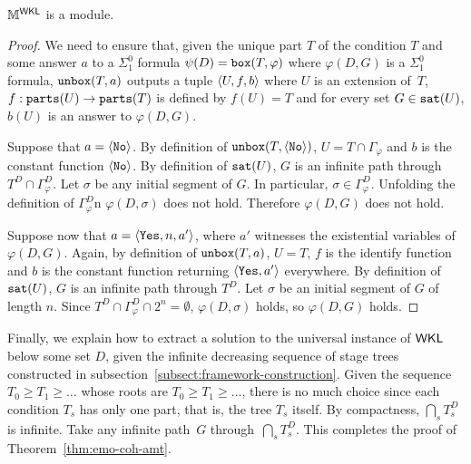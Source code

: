 \begin{lemma}
$\mathbb{M}^{\operatorname{\sf{WKL}}}$ is a module.
\end{lemma}
\begin{proof}
We need to ensure that, given the unique part $T$ of the condition $T$
and some answer $a$ to a $\Sigma^0_1$ formula $\psi(D) = \mathtt{box}(T, \varphi)$
where $\varphi(D, G)$ is a $\Sigma^0_1$ formula, $\mathtt{unbox}(T, a)$
outputs a tuple $\left\langle U, f, b \right\rangle$ where $U$ is an extension of~$T$,
$f : \mathtt{parts}(U) \to \mathtt{parts}(T)$ is defined by $f(U) = T$
and for every set $G \in \mathtt{sat}(U)$, $b(U)$ is an answer to $\varphi(D, G)$.

Suppose that $a = \left\langle \mathtt{No} \right\rangle$. By definition of $\mathtt{unbox}(T, \left\langle \mathtt{No} \right\rangle)$,
$U = T \cap \Gamma_\varphi$ and $b$ is the constant function $\left\langle \mathtt{No} \right\rangle$. 
By definition of $\mathtt{sat}(U)$, $G$ is an infinite path through $T^D \cap \Gamma^D_\varphi$.
Let $\sigma$ be any initial segment of $G$. In particular, $\sigma \in \Gamma^D_\varphi$. Unfolding the definition of $\Gamma^D_\varphi$n
$\varphi(D, \sigma)$ does not hold. Therefore $\varphi(D, G)$ does not hold.

Suppose now that $a = \left\langle \mathtt{Yes}, n, a' \right\rangle$, where $a'$ witnesses the existential variables of $\varphi(D, G)$.
Again, by definition of $\mathtt{unbox}(T, a)$, $U = T$, $f$ is the identify function 
and $b$ is the constant function returning $\left\langle \mathtt{Yes}, a' \right\rangle$ everywhere.
By definition of $\mathtt{sat}(U)$, $G$ is an infinite path through $T^D$.
Let $\sigma$ be an initial segment of $G$ of length $n$. Since $T^D \cap \Gamma^D_\varphi \cap 2^n = \emptyset$,
$\varphi(D, \sigma)$ holds, so $\varphi(D, G)$ holds.
\end{proof}

Finally, we explain how to extract a solution to the universal instance of $\operatorname{\sf{WKL}}$ below some set $D$,
given the infinite decreasing sequence of stage trees constructed in subsection~\ref{subsect:framework-construction}.
Given the sequence $T_0 \geq T_1 \geq \dots$ whose roots are $T_0 \geq T_1 \geq \dots$,
there is no much choice since each condition $T_s$ has only one part, that is, the tree $T_s$ itself.
By compactness, $\bigcap_s T_s^D$ is infinite. Take any infinite path~$G$ through~$\bigcap_s T_s^D$.
This completes the proof of Theorem~\ref{thm:emo-coh-amt}.



